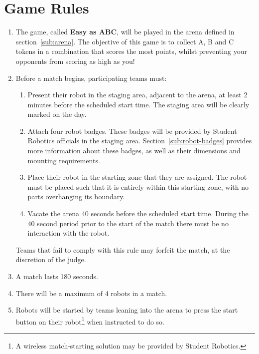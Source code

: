 \section {Game Rules}
\label{game-rules}

\begin{enumerate}
\item The game, called \textbf{Easy as ABC}, will be played in the arena defined in section~\ref{sub:arena}.  The objective of this game is to collect A, B and C tokens in a combination that scores the most points, whilst preventing your opponents from scoring as high as you!

\item Before a match begins, participating teams must:
\begin {enumerate}
  \item Present their robot in the staging area, adjacent to the arena, at least 2 minutes before the scheduled start time.
        The staging area will be clearly marked on the day.

  \item Attach four robot badges.
        These badges will be provided by Student Robotics officials in the staging area.
        Section~\ref{sub:robot-badges} provides more information about these badges, as well as their dimensions and mounting requirements.

  \item Place their robot in the starting zone that they are assigned.
        The robot must be placed such that it is entirely within this starting zone, with no parts overhanging its boundary.

  \item Vacate the arena 40 seconds before the scheduled start time.
        During the 40 second period prior to the start of the match there must be no interaction with the robot.
\end{enumerate}
  Teams that fail to comply with this rule may forfeit the match, at the discretion of the judge.

\item A match lasts 180 seconds.

\item There will be a maximum of 4 robots in a match.

\item Robots will be started by teams leaning into the arena to press the start button on their robot\footnote{A wireless match-starting solution may be provided by Student Robotics.} when instructed to do so.


\end{enumerate}
